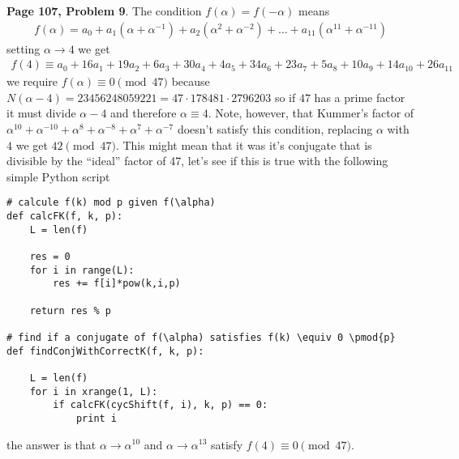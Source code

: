 \documentclass[aps,preprint,preprintnumbers,nofootinbib,showpacs,prd]{revtex4-1}
\newcommand{\nbea}{\begin{eqnarray*}}
\newcommand{\neea}{\end{eqnarray*}}
\begin{document}
{\bf Page 107, Problem 9}. The condition $f(\alpha) = f(-\alpha)$ means
%
\nbea
f(\alpha) = a_0 + a_1(\alpha + \alpha^{-1}) + a_2(\alpha^2 + \alpha^{-2}) + \dots + a_{11}(\alpha^{11} + \alpha^{-11})
\neea
%
setting $\alpha \to 4$ we get
%
\nbea
f(4) \equiv a_0 + 16 a_1 + 19 a_2 + 6a_{3} + 30a_{4} + 4a_{5} + 34a_{6} + 23a_{7} + 5a_{8} + 10a_{9} + 14a_{10} + 26a_{11}
\neea
%
we require $f(\alpha) \equiv 0 \pmod{47}$ because $N(\alpha - 4) = 23456248059221 = 47 \cdot 178481 \cdot 2796203$ so if $47$ has a prime factor it must divide $\alpha - 4$ and therefore $\alpha \equiv 4$. Note, however, that Kummer's factor of $\alpha^{10} + \alpha^{-10} + \alpha^{8} + \alpha^{-8} + \alpha^{7} + \alpha^{-7}$ doesn't satisfy this condition, replacing $\alpha$ with $4$ we get $42 \pmod{47}$. This might mean that it was it's conjugate that is divisible by the ``ideal'' factor of 47, let's see if this is true with the following simple Python script
%
\begin{Verbatim}[baselinestretch=0.75]
# calcule f(k) mod p given f(\alpha)
def calcFK(f, k, p):
    L = len(f)

    res = 0
    for i in range(L):
        res += f[i]*pow(k,i,p)

    return res % p

# find if a conjugate of f(\alpha) satisfies f(k) \equiv 0 \pmod{p}
def findConjWithCorrectK(f, k, p):

    L = len(f)
    for i in xrange(1, L):
        if calcFK(cycShift(f, i), k, p) == 0:
            print i
\end{Verbatim}
%
the answer is that $\alpha \to \alpha^{10}$ and $\alpha \to \alpha^{13}$ satisfy $f(4) \equiv 0 \pmod{47}$.
\end{document}
